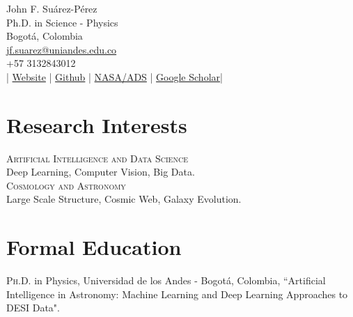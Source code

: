 \documentclass[10pt, a4paper]{article}
\newcommand{\years}[1]{\marginnote{\scriptsize #1}}
\begin{document}
{\LARGE John F. Suárez-Pérez}\\[0.5cm]
Ph.D. in Science - Physics\\
Bogotá, Colombia\\
\href{mailto:jf.suarez@uniandes.edu.co}{jf.suarez@uniandes.edu.co}\\
+57 3132843012 \\[.2cm]

|\hspace{0.3cm}
\href{https://jsuarez314.gitlab.io}{Website}
\hspace{0.3cm}|\hspace{0.3cm}
\href{https://github.com/jsuarez314}{Github}
\hspace{0.3cm}|\hspace{0.3cm}
\href{
https://ui.adsabs.harvard.edu/search/p_=0&q=\%20author\%3A\%22Su\%C3\%A1rez-P\%C3\%A9rez\%2C\%20John
\%20F.\%22&sort=date\%20desc\%2C\%20bibcode\%20desc}{NASA/ADS}
\hspace{0.3cm}|\hspace{0.3cm}
\href{https://scholar.google.com/citations?user=_Z9iT9sAAAAJ}{Google Scholar}\hspace{0.3cm}|


\section*{Research Interests}
\noindent
\textsc{Artificial Intelligence and Data Science}\\
Deep Learning, Computer Vision, Big Data.\\

\textsc{Cosmology and Astronomy}\\
Large Scale Structure, Cosmic Web, Galaxy Evolution.\\

\section*{Formal Education}
\noindent
\years{2023}\textsc{Ph.D.} in Physics, Universidad de los Andes - Bogotá, Colombia, “Artificial 
Intelligence in Astronomy: Machine Learning and Deep Learning Approaches to DESI Data".\\
\end{document}
